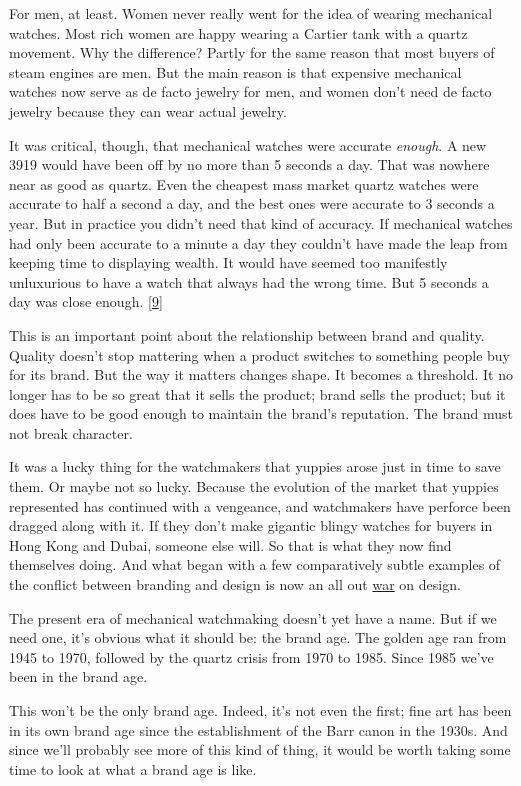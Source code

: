 For men, at least. Women never really went for the idea of wearing
mechanical watches. Most rich women are happy wearing a Cartier tank
with a quartz movement. Why the difference? Partly for the same reason
that most buyers of steam engines are men. But the main reason is that
expensive mechanical watches now serve as de facto jewelry for men, and
women don't need de facto jewelry because they can wear actual jewelry.

It was critical, though, that mechanical watches were accurate
\emph{enough}. A new 3919 would have been off by no more than 5 seconds
a day. That was nowhere near as good as quartz. Even the cheapest mass
market quartz watches were accurate to half a second a day, and the best
ones were accurate to 3 seconds a year. But in practice you didn't need
that kind of accuracy. If mechanical watches had only been accurate to a
minute a day they couldn't have made the leap from keeping time to
displaying wealth. It would have seemed too manifestly unluxurious to
have a watch that always had the wrong time. But 5 seconds a day was
close enough. {[}\hyperref[f9n]{9}{]}

This is an important point about the relationship between brand and
quality. Quality doesn't stop mattering when a product switches to
something people buy for its brand. But the way it matters changes
shape. It becomes a threshold. It no longer has to be so great that it
sells the product; brand sells the product; but it does have to be good
enough to maintain the brand's reputation. The brand must not break
character.

It was a lucky thing for the watchmakers that yuppies arose just in time
to save them. Or maybe not so lucky. Because the evolution of the market
that yuppies represented has continued with a vengeance, and watchmakers
have perforce been dragged along with it. If they don't make gigantic
blingy watches for buyers in Hong Kong and Dubai, someone else will. So
that is what they now find themselves doing. And what began with a few
comparatively subtle examples of the conflict between branding and
design is now an all out
\href{https://www.patek.com/en/collection/grand-complications/6300-400g-001}{war}
on design.

The present era of mechanical watchmaking doesn't yet have a name. But
if we need one, it's obvious what it should be: the brand age. The
golden age ran from 1945 to 1970, followed by the quartz crisis from
1970 to 1985. Since 1985 we've been in the brand age.

This won't be the only brand age. Indeed, it's not even the first; fine
art has been in its own brand age since the establishment of the Barr
canon in the 1930s. And since we'll probably see more of this kind of
thing, it would be worth taking some time to look at what a brand age is
like.

